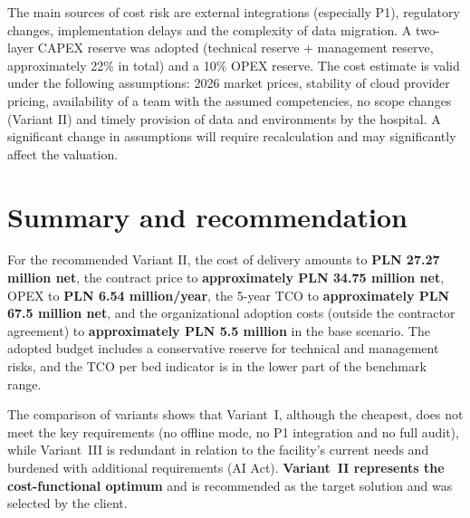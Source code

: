 The main sources of cost risk are external integrations (especially P1), regulatory changes, implementation delays and the complexity of data migration. A two-layer CAPEX reserve was adopted (technical reserve + management reserve, approximately 22\% in total) and a 10\% OPEX reserve. The cost estimate is valid under the following assumptions: 2026 market prices, stability of cloud provider pricing, availability of a team with the assumed competencies, no scope changes (Variant II) and timely provision of data and environments by the hospital. A significant change in assumptions will require recalculation and may significantly affect the valuation.

\section{Summary and recommendation}
\label{sec:rekomendacja}

For the recommended Variant II, the cost of delivery amounts to \textbf{PLN 27.27 million net}, the contract price to \textbf{approximately PLN 34.75 million net}, OPEX to \textbf{PLN 6.54 million/year}, the 5-year TCO to \textbf{approximately PLN 67.5 million net}, and the organizational adoption costs (outside the contractor agreement) to \textbf{approximately PLN 5.5 million} in the base scenario. The adopted budget includes a conservative reserve for technical and management risks, and the TCO per bed indicator is in the lower part of the benchmark range.

The comparison of variants shows that Variant~I, although the cheapest, does not meet the key requirements (no offline mode, no P1 integration and no full audit), while Variant~III is redundant in relation to the facility's current needs and burdened with additional requirements (AI Act). \textbf{Variant~II represents the cost-functional optimum} and is recommended as the target solution and was selected by the client.
